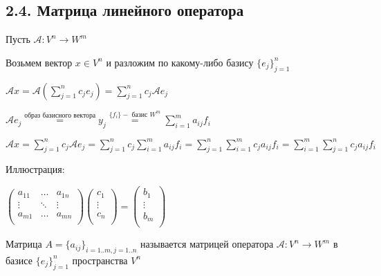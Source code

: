 \documentclass[12pt]{article}
\begin{document}
    \subsection[p2\_4]{2.4. Матрица линейного оператора}

    Пусть $\mathcal{A} : V^n \rightarrow W^m$

    Возьмем вектор $x \in V^n$ и разложим по какому-либо базису $\{e_j\}^n_{j=1}$

    $\mathcal{A}x = \mathcal{A} \left(\sum^n_{j=1} c_j e_j\right) = \sum^n_{j=1} c_j \mathcal{A}e_j$

    $\mathcal{A} e_j \stackrel{\text{образ базисного вектора}}{=} y_j \stackrel{\{f_i\} - \text{ базис } W^m}{=} \sum^m_{i=1} a_{ij}f_i$

    $\mathcal{A}x = \sum^n_{j=1} c_j \mathcal{A}e_j = \sum^n_{j=1} c_j \sum^m_{i=1} a_{ij}f_i = \sum^n_{j=1} \sum^m_{i=1} c_j a_{ij} f_i = \sum^m_{i=1} \sum^n_{j=1} c_j a_{ij} f_i$

    Иллюстрация:

    $\begin{pmatrix}
         a_{11} & \dots & a_{1n} \\
         \vdots & \ddots & \vdots \\
         a_{m1} & \dots & a_{mn} \\
    \end{pmatrix} \begin{pmatrix}
         c_{1} \\
         \vdots \\
         c_{n} \\
    \end{pmatrix} = \begin{pmatrix}
         b_{1} \\
         \vdots \\
         b_{m} \\
    \end{pmatrix}$

    \hypertarget{operatorsmatrix}{}

    \Def Матрица $A = \{a_{ij}\}_{i=1..m, j=1..n}$ называется матрицей оператора $\mathcal{A} : V^n \rightarrow W^m$ в базисе $\{e_j\}^n_{j=1}$ пространства $V^n$
\end{document}
